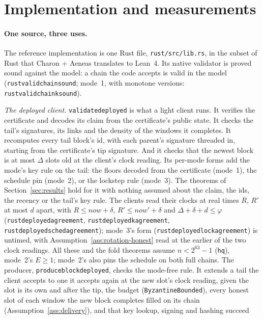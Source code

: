 \documentclass[10pt]{article}
\DeclareRobustCommand{\code}[1]{{\renewcommand{\_}{\textunderscore\allowbreak}\texttt{#1}}}
\begin{document}
\section{Implementation and measurements}
\label{sec:impl}

\paragraph{One source, three uses.} The reference implementation is one
Rust file, \code{rust/src/lib.rs}, in the subset of Rust that Charon +
Aeneas translates to Lean~4. Its native validator is proved sound
against the model: a chain the code accepts is valid in the model
(\code{rust\_valid\_chain\_sound}; mode~1, with monotone versions:
\code{rust\_valid\_chain\_k\_sound}).

\emph{The deployed client.} \code{validate\_deployed} is what a light
client runs. It verifies the certificate and decodes its claim from the
certificate's public state. It checks the tail's signatures, its links
and the density of the windows it completes. It recomputes every tail
block's id, with each parent's signature threaded in, starting from the
certificate's tip signature. And it checks that the newest block is at
most $\Delta$ slots old at the client's clock reading. Its per-mode forms
add the mode's key rule on the tail: the floors decoded from the
certificate (mode~1), the schedule pin (mode~2), or the lockstep rule
(mode~3). The theorems of Section~\ref{sec:results} hold for it with
nothing assumed about the claim, the ids, the recency or the tail's key
rule. The clients read their clocks at real times $R$, $R'$ at most $d$
apart, with $R \le \mathit{now} + \delta$, $R' \le \mathit{now}' + \delta$ and
$\Delta + \delta + d \le \varphi$ (\code{rust\_deployed\_agreement},
\code{rust\_deployed\_k\_agreement},
\code{rust\_deployed\_sched\_agreement}); mode~3's form
(\code{rust\_deployed\_lock\_agreement}) is untimed, with
Assumption~\ref{ass:rotation-honest} read at the earlier of the two
clock readings. All these and the fold theorems assume $n < 2^{63}-1$
(\code{hq}), mode~2's $E \ge 1$; mode~2's also pins the schedule on both
full chains. The producer,
\code{produce\_block\_deployed}, checks the mode-free rule. It extends
a tail the client accepts to one it accepts again at the new slot's
clock reading, given the slot is its own and after the tip, the budget
(\code{ByzantineBounded}), every honest slot of each window the new
block completes filled on its chain (Assumption~\ref{ass:delivery}),
and that key lookup, signing and hashing succeed
\end{document}
